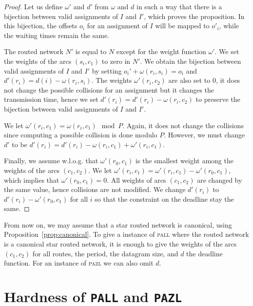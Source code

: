 \documentclass[a4paper,10pt]{journal}
\newcommand\pazl{\textsc{pazl}\xspace}
\newcommand\pall{\textsc{pall}\xspace}
\begin{document}
  \begin{proof}
  Let us define $\omega'$ and $d'$ from $\omega$ and $d$ in such a way that there is a bijection 
   between valid assignments of $I$ and $I'$, which proves the proposition. In this bijection,
   the offsets $o_i$ for an assignment of $I$ will be mapped to $o'_i$, while the waiting times remain the same.
  
  The routed network $N'$ is equal to $N$ except for the weight function $\omega'$.
  We set the weights of the arcs $(s_i,c_1)$ to zero in $N'$. We obtain the bijection between valid assignments of $I$ and $I'$ by setting $o_i' + \omega(r_i,s_i) = o_i $ and $d'(r_i) = d(i) - \omega(r_i,s_i)$. The weights $\omega'(r_i,c_2)$ are also set to $0$, it does not change the possible collisions
  for an assignment but it changes the transmission time, hence we set $d'(r_i) = d'(r_i) - \omega(r_i,c_2)$
  to preserve the bijection between valid assignments of $I$ and $I'$. 

  We let $\omega'(r_i,c_1) = \omega(r_i,c_1) \mod P$. Again, it does not change the collisions since computing a possible collision is done modulo $P$. However, we must change $d'$ to be $d'(r_i) = d'(r_i) - \omega(r_i,c_1) + \omega'(r_i,c_1)$.

  Finally, we assume w.l.o.g. that $\omega'(r_0,c_1)$ is the smallest weight among the weights of the arcs
  $(c_1,c_2)$. We let $\omega'(r_i,c_1) = \omega'(r_i,c_1) - \omega'(r_0,c_1)$, which implies that $\omega'(r_0,c_1) = 0$.  All weights of arcs $(c_1,c_2)$ are changed by the same value, hence collisions are not modified. We change $d'(r_i)$ to  $d'(r_i) - \omega'(r_0,c_1)$ for all $i$ so that the constraint on the deadline stay the same.
  \end{proof}

   From now on, we may assume that a star routed network is canonical, using Proposition~\ref{prop:canonical}. To give a instance of \pall where the routed network is a canonical star routed network, it is enough to give the weights of the arcs $(c_1,c_2)$ for all routes, the period, the datagram size, and $d$ the deadline function. For an instance of \pazl we can also omit $d$.


\section{Hardness of \texttt{PALL} and \texttt{PAZL}}
  \label{sec:complexity}
\end{document}
